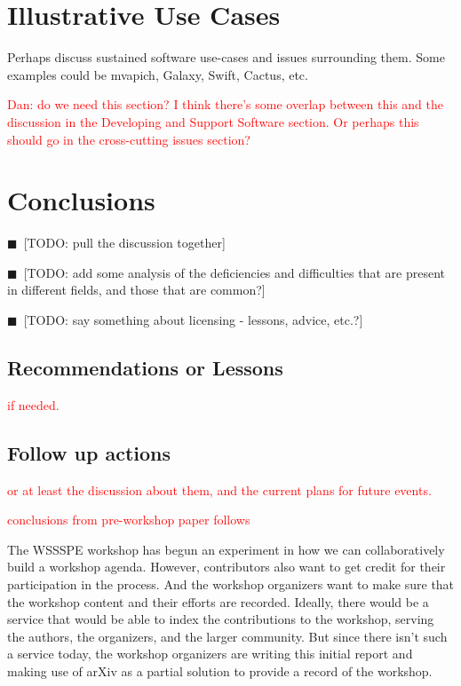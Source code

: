 \documentclass[11pt, oneside]{amsart}
\newcommand{\todo}[1]{{\color{blue}$\blacksquare$~\textsf{[TODO: #1]}}}
\newcommand{\note}[1]{ {\textcolor{red}    { #1 }}}
\begin{document}
\section{Illustrative Use Cases} \label{sec:use-cases}


Perhaps discuss sustained software use-cases and issues surrounding them. Some examples could be mvapich, Galaxy, Swift, Cactus, etc.

\note{Dan: do we need this section?  I think there's some overlap between this and the discussion in the Developing and Support Software section.  Or perhaps this should go in the cross-cutting issues section?}

\section{Conclusions} \label{sec:conclusions}


\todo{pull the discussion together}

\todo{add some analysis of the deficiencies and difficulties that are present in different fields, and those that are common?}

\todo{say something about licensing - lessons, advice, etc.?}

\subsection{Recommendations or Lessons}

\note{if needed.}

\subsection{Follow up actions}

\note{or at least the discussion about them, and the current plans for future events.}

\note{conclusions from pre-workshop paper follows}

The WSSSPE workshop has begun an experiment in how we can collaboratively build a workshop 
agenda. However, contributors also want to get credit for their participation in the process. And the 
workshop organizers want to make sure that the workshop content and their efforts are recorded. 
Ideally, there would be a service that would be able to index the contributions to the workshop, 
serving the authors, the organizers, and the larger community. But since there isn't such a service 
today, the workshop organizers are writing this initial report and making use of arXiv as a partial 
solution to provide a record of the workshop.
\end{document}
